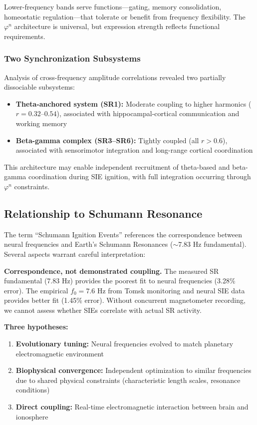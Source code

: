 \documentclass[11pt,a4paper]{article}
\newcommand{\phisym}{\varphi}
\begin{document}
Lower-frequency bands serve functions---gating, memory consolidation, homeostatic regulation---that tolerate or benefit from frequency flexibility. The $\phisym^n$ architecture is universal, but expression strength reflects functional requirements.

\subsubsection{Two Synchronization Subsystems}
Analysis of cross-frequency amplitude correlations revealed two partially dissociable subsystems:
\begin{itemize}
    \item \textbf{Theta-anchored system (SR1):} Moderate coupling to higher harmonics ($r = 0.32$--$0.54$), associated with hippocampal-cortical communication and working memory \parencite{hyman2005medial}
    \item \textbf{Beta-gamma complex (SR3--SR6):} Tightly coupled (all $r > 0.6$), associated with sensorimotor integration and long-range cortical coordination \parencite{engel2010beta}
\end{itemize}

This architecture may enable independent recruitment of theta-based and beta-gamma coordination during SIE ignition, with full integration occurring through $\phisym^n$ constraints.

\subsection{Relationship to Schumann Resonance}

The term ``Schumann Ignition Events'' references the correspondence between neural frequencies and Earth's Schumann Resonances ($\sim$7.83 Hz fundamental). Several aspects warrant careful interpretation:

\textbf{Correspondence, not demonstrated coupling.} The measured SR fundamental (7.83 Hz) provides the poorest fit to neural frequencies (3.28\% error). The empirical $f_0 = 7.6$ Hz from Tomsk monitoring and neural SIE data provides better fit (1.45\% error). Without concurrent magnetometer recording, we cannot assess whether SIEs correlate with actual SR activity.

\textbf{Three hypotheses:}
\begin{enumerate}
    \item \textbf{Evolutionary tuning:} Neural frequencies evolved to match planetary electromagnetic environment
    \item \textbf{Biophysical convergence:} Independent optimization to similar frequencies due to shared physical constraints (characteristic length scales, resonance conditions)
    \item \textbf{Direct coupling:} Real-time electromagnetic interaction between brain and ionosphere
\end{enumerate}
\end{document}
